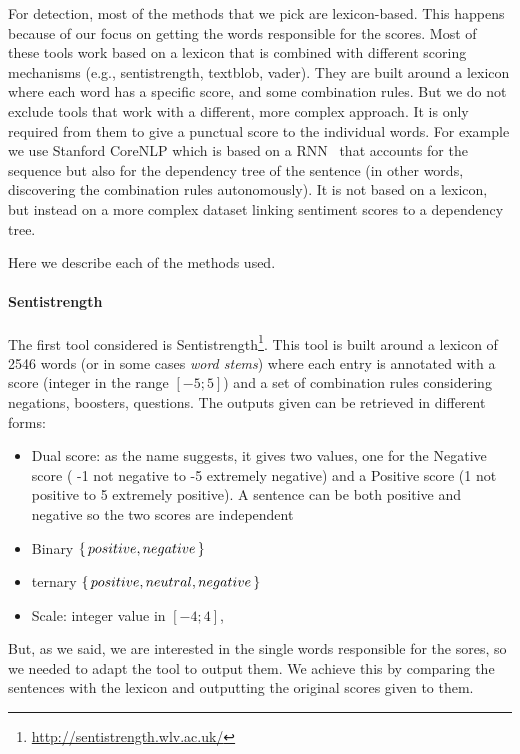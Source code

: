 For detection, most of the methods that we pick are lexicon-based. This happens because of our focus on getting the words responsible for the scores. Most of these tools work based on a lexicon that is combined with different scoring mechanisms (e.g., sentistrength, textblob, vader). They are built around a lexicon where each word has a specific score, and some combination rules. But we do not exclude tools that work with a different, more complex approach. It is only required from them to give a punctual score to the individual words. For example we use Stanford CoreNLP which is based on a RNN~\citep{socher2013recursive} that accounts for the sequence but also for the dependency tree of the sentence (in other words, discovering the combination rules autonomously). It is not based on a lexicon, but instead on a more complex dataset linking sentiment scores to a dependency tree.

Here we describe each of the methods used.

\paragraph{Sentistrength}
The first tool considered is Sentistrength\footnote{\url{http://sentistrength.wlv.ac.uk/}}. This tool is built around a lexicon of 2546 words (or in some cases \emph{word stems}) where each entry is annotated with a score (integer in the range $[-5;5]$) and a set of combination rules considering negations, boosters, questions. The outputs given can be retrieved in different forms:
\begin{itemize}
    \item Dual score: as the name suggests, it gives two values, one for the Negative score ( -1 not negative to -5 extremely negative) and a Positive score (1 not positive to 5 extremely positive). A sentence can be both positive and negative so the two scores are independent
    \item Binary $\set{positive, negative}$
    \item ternary $\set{positive, neutral, negative}$
    \item Scale: integer value in $[-4;4]$,
\end{itemize}

But, as we said, we are interested in the single words responsible for the sores, so we needed to adapt the tool to output them. We achieve this by comparing the sentences with the lexicon and outputting the original scores given to them.


